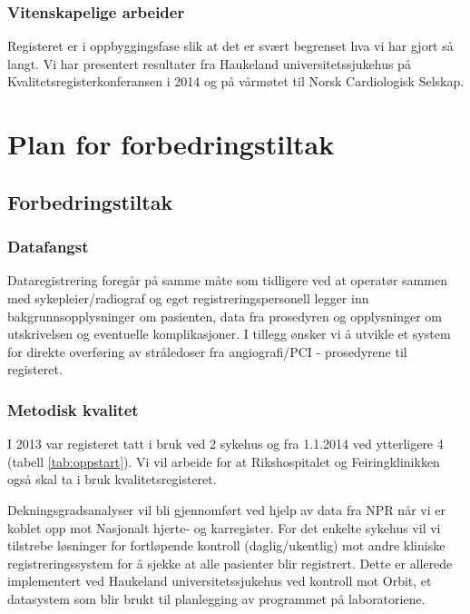 \documentclass[norsk, a4paper]{report}
\begin{document}
\section{Vitenskapelige arbeider}\label{sec:vitarb}
Registeret er i oppbyggingsfase slik at det er svært begrenset hva vi har gjort så langt. Vi har presentert resultater fra Haukeland universitetssjukehus på Kvalitetsregisterkonferansen i 2014 og på vårmøtet til Norsk Cardiologisk Selskap.





\part{Plan for forbedringstiltak}\label{par:for}

\chapter{Forbedringstiltak}

\section{Datafangst}

Dataregistrering foregår på samme måte som tidligere ved at operatør sammen med sykepleier/radiograf og eget registreringspersonell legger inn bakgrunnsopplysninger om pasienten, data fra prosedyren og opplysninger om utskrivelsen og eventuelle komplikasjoner. I tillegg ønsker vi å utvikle et system for direkte overføring av stråledoser fra angiografi/PCI - prosedyrene til registeret.


\section{Metodisk kvalitet}

I 2013 var registeret tatt i bruk ved 2 sykehus og fra 1.1.2014 ved ytterligere 4 (tabell \ref{tab:oppstart}). Vi vil arbeide for at Rikshospitalet og Feiringklinikken også skal ta i bruk kvalitetsregisteret.

Dekningsgradsanalyser vil bli gjennomført ved hjelp av data fra NPR når vi er koblet opp mot Nasjonalt hjerte- og karregister. For det enkelte sykehus vil vi tilstrebe løsninger for fortløpende kontroll (daglig/ukentlig) mot andre kliniske registreringssystem for å sjekke at alle pasienter blir registrert. Dette er allerede implementert ved Haukeland universitetssjukehus ved kontroll mot Orbit, et datasystem som blir brukt til planlegging av programmet på laboratoriene. 
\end{document}
